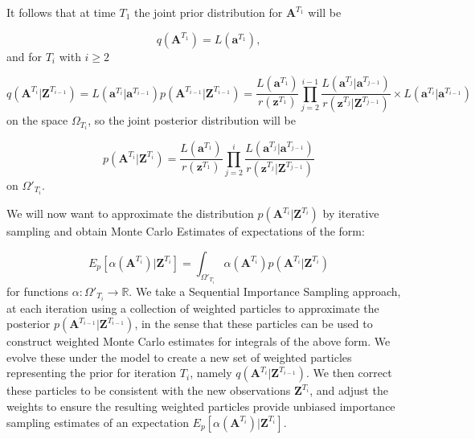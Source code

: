\documentclass{article}
\renewcommand{\vec}[1]{\mathbf{#1}}
\begin{document}
It follows that at time $T_1$ the joint prior distribution for $\vec{A}^{T_1}$ will be

\begin{equation*}
    q(\vec{A}^{T_1}) = L(\vec{a}^{T_1}),
\end{equation*}
and for $T_i$ with $i \geq 2$

\begin{equation*}
    q(\vec{A}^{T_i} | \vec{Z}^{T_{i-1}}) = L(\vec{a}^{T_i} | \vec{a}^{T_{i-1}}) p(\vec{A}^{T_{i-1}} | \vec{Z}^{T_{i-1}}) = \frac{L(\vec{a}^{T_1})}{r(\vec{z}^{T_1})} \prod_{j=2}^{i-1} \frac{L(\vec{a}^{T_j} | \vec{a}^{T_{j-1}})}{r(\vec{z}^{T_j} | \vec{Z}^{T_{j-1}})} \times L(\vec{a}^{T_i} | \vec{a}^{T_{i-1}})
\end{equation*}
on the space $\Omega_{T_i}$, so the joint posterior distribution will be

\begin{equation*}
    p(\vec{A}^{T_i} | \vec{Z}^{T_i}) = \frac{L(\vec{a}^{T_1})}{r(\vec{z}^{T_1})} \prod_{j=2}^{i} \frac{L(\vec{a}^{T_j} | \vec{a}^{T_{j-1}})}{r(\vec{z}^{T_j} | \vec{Z}^{T_{j-1}})}
\end{equation*}
on $\Omega'_{T_i}$.

We will now want to approximate the distribution $p(\vec{A}^{T_i} | \vec{Z}^{T_i})$ by iterative sampling and obtain Monte Carlo Estimates of expectations of the form:

\begin{equation*}
    E_p[\alpha(\vec{A}^{T_i}) | \vec{Z}^{T_i}] = \int_{\Omega'_{T_i}} \alpha(\vec{A}^{T_i}) p(\vec{A}^{T_i} | \vec{Z}^{T_i})
\end{equation*}
for functions $\alpha : \Omega'_{T_i} \rightarrow \mathbb{R}$.
We take a Sequential Importance Sampling approach, at each iteration using a collection of weighted particles to approximate the posterior $p(\vec{A}^{T_{i-1}} | \vec{Z}^{T_{i-1}})$, in the sense that these particles can be used to construct weighted Monte Carlo estimates for integrals of the above form. We evolve these under the model to create a new set of weighted particles representing the prior for iteration $T_i$, namely $q(\vec{A}^{T_i} | \vec{Z}^{T_{i-1}})$. We then correct these particles to be consistent with the new observations $\vec{Z}^{T_i}$, and adjust the weights to ensure the resulting weighted particles provide unbiased importance sampling estimates of an expectation $E_p[\alpha(\vec{A}^{T_i}) | \vec{Z}^{T_i}]$.
\end{document}
